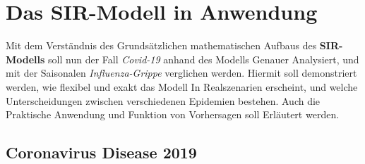 \documentclass[12pt]{scrartcl} %
\begin{document}








\section{Das SIR-Modell in Anwendung}

Mit dem Verständnis des Grundsätzlichen mathematischen Aufbaus des \textbf{SIR-Modells} soll nun der Fall \textsl{Covid-19} anhand des Modells Genauer Analysiert, und mit der Saisonalen \textsl{Influenza-Grippe} verglichen werden. Hiermit soll demonstriert werden, wie flexibel und exakt das Modell In Realszenarien erscheint, und welche Unterscheidungen zwischen verschiedenen Epidemien bestehen. Auch die Praktische Anwendung und Funktion von Vorhersagen soll Erläutert werden.


\subsection{Coronavirus Disease 2019}
\end{document}
